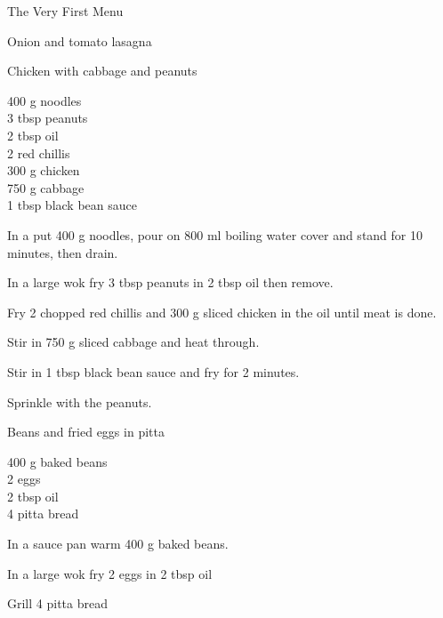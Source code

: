 \begin{menu}{The Very First Menu}
\begin{recipe}{2}{Onion and tomato lasagna}
\begin{instructions}
    \end{instructions}
    \end{recipe}%
  
    \begin{recipe}{2}{Chicken with cabbage and peanuts}%
    
		\begin{ingredients}
		400 g noodles  \\
	3 tbsp peanuts  \\
	2 tbsp oil  \\
	2  red chillis  \\
	300 g chicken  \\
	750 g cabbage  \\
	1 tbsp black bean sauce  \\
	
		\end{ingredients}
	
    \begin{instructions}
    \item 
      In a 
      put
      400 g  noodles,
      pour on
      800 ml  boiling water
      cover and stand for 10 minutes, then drain.
    \item 
				In a large wok	fry
				3 tbsp  peanuts
				in
				2 tbsp  oil
				then remove.
			\item 
				Fry 2  chopped red chillis
				and
				300 g sliced chicken
				in the oil until meat is done.
			\item 
				Stir in
				750 g sliced cabbage
				and heat through.
			\item 
				Stir in 
				1 tbsp  black bean sauce
				and fry for 2 minutes.
			\item 
				Sprinkle with the peanuts.
			
    \end{instructions}
    \end{recipe}%
  
    \begin{recipe}{1}{Beans and fried eggs in pitta}%
    
		\begin{ingredients}
		400 g baked beans  \\
	2  eggs  \\
	2 tbsp oil  \\
	4  pitta bread  \\
	
		\end{ingredients}
	
    \begin{instructions}
    \item 
				In a sauce pan warm
				400 g  baked beans.
			\item 
				In a large wok fry
				2   eggs
				in 
				2 tbsp  oil\item 
				Grill
				4   pitta bread
    \end{instructions}
    \end{recipe}%
  

\end{menu}
